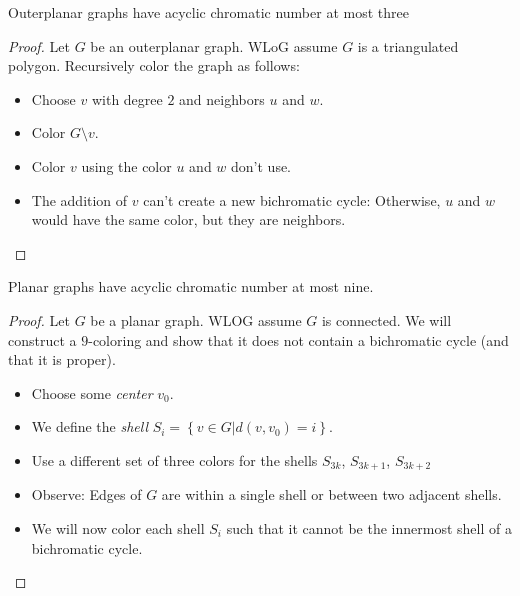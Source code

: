 \documentclass[t]{beamer}
\begin{document}
\begin{frame}
    \begin{theorem}[Grünbaum 1972]
	Outerplanar graphs have acyclic chromatic number at most three
    \end{theorem}
    \pause
    \begin{proof}
	Let $G$ be an outerplanar graph. \pause WLoG assume $G$ is a triangulated polygon. Recursively color the graph as follows:\pause
	\begin{itemize}
	    \item Choose $v$ with degree $2$ and neighbors $u$ and $w$.
		\pause
	    \item Color $G\setminus v$.
		\pause
	    \item Color $v$ using the color $u$ and $w$ don't use. 
		\pause
	    \item The addition of $v$ can't create a new bichromatic cycle: Otherwise, $u$ and $w$ would have the same color, but they are neighbors.
	\end{itemize}
    \end{proof}
\end{frame}

\begin{frame}
    \begin{theorem}[Grünbaum 1972]
	Planar graphs have acyclic chromatic number at most nine.
    \end{theorem}
    \pause
    \begin{proof}
	Let $G$ be a planar graph. \pause WLOG assume $G$ is connected. \pause We will construct a $9$-coloring and show that it does not contain a bichromatic cycle \pause (and that it is proper).
	\begin{itemize}
		\pause
	    \item Choose some \textit{center} $v_0$.
		\pause
	    \item We define the \emph{shell} $S_i = \left\{v \in G | d(v, v_0)=i\right\}$. 
		\pause
	    \item Use a different set of three colors for the shells $S_{3k}$, $S_{3k+1}$, $S_{3k+2}$
		\pause
	    \item Observe: Edges of $G$ are within a single shell or between two adjacent shells.
		\pause
	    \item We will now color each shell $S_i$ such that it cannot be the innermost shell of a bichromatic cycle.
	\end{itemize}
	\phantom\qedhere
    \end{proof}
\end{frame}
\end{document}
